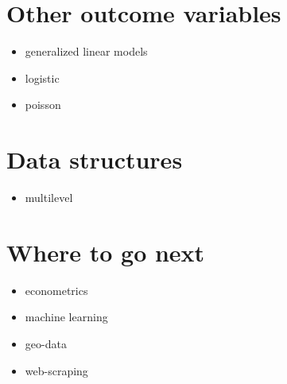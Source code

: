 \documentclass[
]{book}
\providecommand{\tightlist}{%
  \setlength{\itemsep}{0pt}\setlength{\parskip}{0pt}}
\begin{document}
\hypertarget{other-outcome-variables}{%
\section{Other outcome variables}\label{other-outcome-variables}}

\begin{itemize}
\tightlist
\item
  generalized linear models
\item
  logistic
\item
  poisson
\end{itemize}

\hypertarget{data-structures}{%
\section{Data structures}\label{data-structures}}

\begin{itemize}
\tightlist
\item
  multilevel
\end{itemize}

\hypertarget{where-to-go-next}{%
\section{Where to go next}\label{where-to-go-next}}

\begin{itemize}
\tightlist
\item
  econometrics
\item
  machine learning
\item
  geo-data
\item
  web-scraping
\end{itemize}

  
\end{document}

